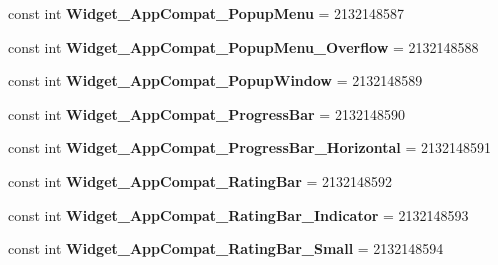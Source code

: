 \begin{DoxyCompactItemize}
\mbox{\label{classst_delivery_1_1_resource_1_1_style_ae3468206f95764d103e67dbf8f0dbaf8}} 
const int {\bfseries Widget\+\_\+\+App\+Compat\+\_\+\+Popup\+Menu} = 2132148587
\item 
\mbox{\label{classst_delivery_1_1_resource_1_1_style_a44f30c750cfe778eb0a6688345b48a3b}} 
const int {\bfseries Widget\+\_\+\+App\+Compat\+\_\+\+Popup\+Menu\+\_\+\+Overflow} = 2132148588
\item 
\mbox{\label{classst_delivery_1_1_resource_1_1_style_a5e82d4dccde5e50fcf68919f70a56275}} 
const int {\bfseries Widget\+\_\+\+App\+Compat\+\_\+\+Popup\+Window} = 2132148589
\item 
\mbox{\label{classst_delivery_1_1_resource_1_1_style_aabcc4f5d49aa11f5a69d1befe911d4b1}} 
const int {\bfseries Widget\+\_\+\+App\+Compat\+\_\+\+Progress\+Bar} = 2132148590
\item 
\mbox{\label{classst_delivery_1_1_resource_1_1_style_adff7ad5e45f5004389bb79a5f68a097c}} 
const int {\bfseries Widget\+\_\+\+App\+Compat\+\_\+\+Progress\+Bar\+\_\+\+Horizontal} = 2132148591
\item 
\mbox{\label{classst_delivery_1_1_resource_1_1_style_a7bc121e369570e6ac61157b4dbf80673}} 
const int {\bfseries Widget\+\_\+\+App\+Compat\+\_\+\+Rating\+Bar} = 2132148592
\item 
\mbox{\label{classst_delivery_1_1_resource_1_1_style_acdb0ddc067be2599d5edb516785a9466}} 
const int {\bfseries Widget\+\_\+\+App\+Compat\+\_\+\+Rating\+Bar\+\_\+\+Indicator} = 2132148593
\item 
\mbox{\label{classst_delivery_1_1_resource_1_1_style_a97dcd947b7180ced2e730377c2944703}} 
const int {\bfseries Widget\+\_\+\+App\+Compat\+\_\+\+Rating\+Bar\+\_\+\+Small} = 2132148594
\item 
\mbox{\label{classst_delivery_1_1_resource_1_1_style_a87edf61d02252b5afb1f00e564a6b136}} 

\end{DoxyCompactItemize}
